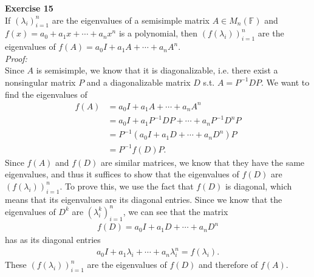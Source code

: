 \documentclass[letterpaper,12pt]{article}
\theoremstyle{definition}
\begin{document}
\textbf{Exercise 15} \\
If $(\lambda_i)_{i=1}^n$ are the eigenvalues of a semisimple matrix $A \in M_n(\mathbb{F})$ and $f(x) = a_0 + a_1x + \cdots + a_nx^n$ is a polynomial, then $(f(\lambda_i))_{i=1}^n$ are the eigenvalues of $f(A) = a_0I + a_1A + \cdots + a_nA^n$. \\
\textit{Proof:} \\
Since $A$ is semisimple, we know that it is diagonalizable, i.e. there exist a nonsingular matrix $P$ and a diagonalizable matrix $D$ s.t. $A = P^{-1} D P$. We want to find the eigenvalues of
\begin{align*}
  f(A) &= a_0I + a_1A + \cdots + a_nA^n \\
  &= a_0I + a_1P^{-1} D P + \cdots + a_nP^{-1} D^n P \\
  &= P^{-1} (a_0I + a_1 D + \cdots + a_n D^n) P \\
  &= P^{-1} f(D) P.
\end{align*}
Since $f(A)$ and $f(D)$ are similar matrices, we know that they have the same eigenvalues, and thus it suffices to show that the eigenvalues of $f(D)$ are $(f(\lambda_i))_{i=1}^n$. To prove this, we use the fact that $f(D)$ is diagonal, which means that its eigenvalues are its diagonal entries. Since we know that the eigenvalues of $D^k$ are $(\lambda_i^k)_{i=1}^n$, we can see that the matrix
\begin{align*}
  f(D) = a_0I + a_1 D + \cdots + a_n D^n
\end{align*}
has as its diagonal entries
\begin{align*}
  a_0I + a_1 \lambda_i + \cdots + a_n \lambda_i^n = f(\lambda_i).
\end{align*}
These $(f(\lambda_i))_{i=1}^n$ are the eigenvalues of $f(D)$ and therefore of $f(A)$. \\
\end{document}
